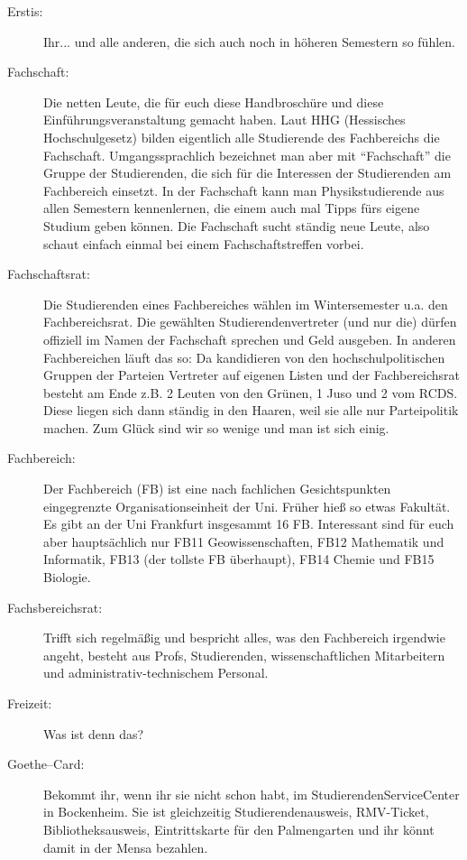 \begin{description}
	\item[Erstis:] Ihr... und alle anderen, die sich auch noch in höheren Semestern so fühlen.

    \item[Fachschaft:] Die netten Leute, die für euch diese Handbroschüre und diese Einführungsveranstaltung gemacht haben. Laut HHG (Hessisches Hochschulgesetz) bilden eigentlich alle Studierende des Fachbereichs die Fachschaft. Umgangssprachlich bezeichnet man aber mit \enquote{Fachschaft} die Gruppe der Studierenden, die sich für die Interessen der Studierenden am Fachbereich einsetzt. In der Fachschaft kann man Physikstudierende aus allen Semestern kennenlernen, die einem auch mal Tipps fürs eigene Studium geben können. Die Fachschaft sucht ständig neue Leute, also schaut einfach einmal bei einem Fachschaftstreffen vorbei.

    \item[Fachschaftsrat:] Die Studierenden eines Fachbereiches wählen im Wintersemester u.a. den Fachbereichsrat. Die gewählten Studierendenvertreter (und nur die) dürfen offiziell im Namen der Fachschaft sprechen und Geld ausgeben. In anderen Fachbereichen läuft das so: Da kandidieren von den hochschulpolitischen Gruppen der Parteien Vertreter auf eigenen Listen und der Fachbereichsrat besteht am Ende z.B. 2 Leuten von den Grünen, 1 Juso und 2 vom RCDS. Diese liegen sich dann ständig in den Haaren, weil sie alle nur Parteipolitik machen. Zum Glück sind wir so wenige und man ist sich einig.

    \item[Fachbereich:] Der Fachbereich (FB) ist eine nach fachlichen Gesichtspunkten eingegrenzte Organisationseinheit der Uni. Früher hieß so etwas Fakultät. Es gibt an der Uni Frankfurt insgesammt 16 FB. Interessant sind für euch aber hauptsächlich nur FB11 Geowissenschaften, FB12 Mathematik und Informatik, FB13 (der tollste FB überhaupt), FB14 Chemie und FB15 Biologie.

    \item[Fachsbereichsrat:] Trifft sich regelmäßig und bespricht alles, was den Fachbereich irgendwie angeht, besteht aus Profs, Studierenden, wissenschaftlichen Mitarbeitern und administrativ-technischem Personal.

    \item[Freizeit:] Was ist denn das?

	\item[Goethe--Card:] Bekommt ihr, wenn ihr sie nicht schon habt, im StudierendenServiceCenter in Bockenheim. Sie ist gleichzeitig Studierendenausweis, RMV-Ticket, Bibliotheksausweis, Eintrittskarte für den Palmengarten und ihr könnt damit in der Mensa bezahlen.


\end{description}
